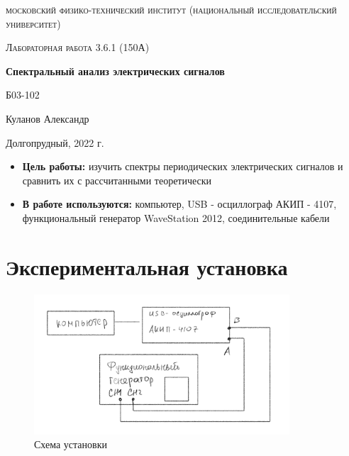 \documentclass[a4paper, 12pt]{article}
\begin{document}
\begin{titlepage}
	\centering
	\vspace{5cm}
	{\scshape\LARGE московский физико-технический институт (национальный исследовательский университет) \par}
	\vspace{6cm}
	{\scshape\Large Лабораторная работа 3.6.1 (150А) \par}
	{\huge\bfseries Спектральный анализ электрических сигналов\par}
	\vspace{1cm}
	\vfill
\begin{flushright}
	{\large Б03-102}\par
	\vspace{0.3cm}
	{\LARGE Куланов Александр}
\end{flushright}
	

	\vfill


	Долгопрудный, 2022 г.
\end{titlepage}

\begin{itemize}
	\item \textbf{Цель работы:} изучить спектры периодических электрических сигналов и сравнить их с рассчитанными теоретически
    \item \textbf{В работе используются:} компьютер, USB - осциллограф АКИП - 4107, функциональный генератор WaveStation 2012, соединительные кабели
    
\end{itemize}

\section{Экспериментальная установка}

\begin{figure}[h]
    \centering
    \includegraphics[width=0.85\textwidth]{set}
    \caption{Схема установки}
    \label{fig:set}
\end{figure}
\end{document}
